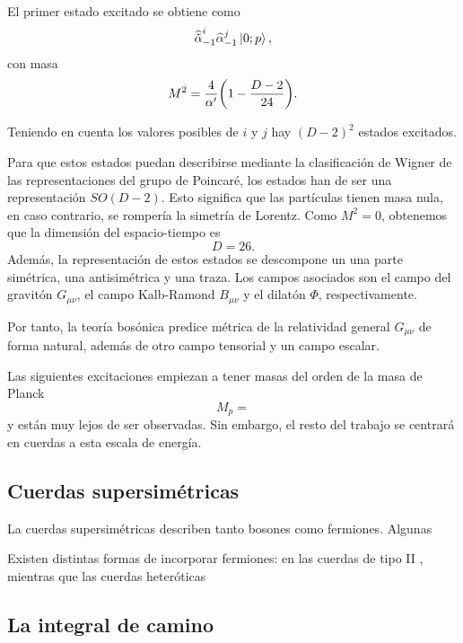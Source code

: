 El primer estado excitado se obtiene como
\begin{equation}
  \widehat{\tilde\alpha}_{-1}^i\widehat \alpha_{-1}^j\ket{0;p},
\end{equation}
con masa
\begin{equation}
  M^2 = \frac{4}{\alpha'}\qty(1-\frac{D-2}{24}).
\end{equation}

Teniendo en cuenta los valores posibles de $i$ y $j$ hay $(D-2)^2$ estados excitados.


Para que estos estados puedan describirse mediante la clasificación de Wigner de las
representaciones del grupo de Poincaré, los estados han de ser una representación $SO(D-2)$.
Esto significa que las partículas tienen masa nula, en caso contrario, se rompería la simetría
de Lorentz. Como $M^2=0$, obtenemos que la dimensión del espacio-tiempo es
\begin{equation}
  D=26.
\end{equation}
Además, la representación de estos estados se descompone un una parte simétrica, una antisimétrica
y una traza. Los campos asociados son el campo del gravitón $G_{\mu\nu}$, el campo Kalb-Ramond $B_{\mu\nu}$
y el dilatón $\Phi$, respectivamente.

Por tanto, la teoría bosónica predice métrica de la relatividad general $G_{\mu\nu}$ de forma 
natural, además de otro campo tensorial y un campo escalar.

Las siguientes excitaciones empiezan a tener masas del orden de la masa de Planck
\begin{equation}
  M_p=
\end{equation}
y están muy lejos de ser observadas. Sin embargo, el resto del trabajo se centrará en cuerdas
a esta escala de energía.


\subsection{Cuerdas supersimétricas}

La cuerdas supersimétricas describen tanto bosones como fermiones.
Algunas 

Existen distintas formas de incorporar fermiones:
en las cuerdas de tipo II , mientras que las cuerdas heteróticas


\subsection{La integral de camino}

